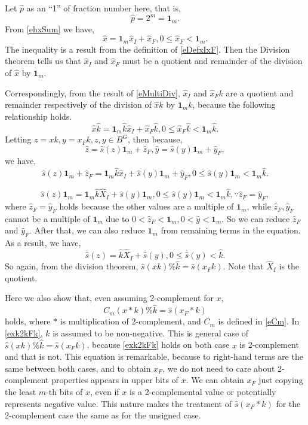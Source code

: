 \documentclass[a4paper]{article}
\newcommand{\eqlabel}[1]{\label{#1}
}
\newcommand{\hx}{{\hat{x}}}
\newcommand{\hp}{{\hat{p}}}
\newcommand{\hy}{{\hat{y}}}
\newcommand{\hz}{{\hat{z}}}
\newcommand{\hk}{{\hat{k}}}
\newcommand{\hs}{{\hat{s}}}
\newcommand{\hX}{{\hat{X}}}
\newcommand{\fum}{{\mathbf{1}_m}}
\begin{document}
Let \(\hp\) as an ``1'' of fraction number here, that is,
\[
    \hp = 2^m = \fum.
\]
From \eqref{ehxSum} we have,
\[
    \hx = \fum \hx_I + \hx_F, 0 \leq \hx_F < \fum.
\]
The inequality is a result from the definition of \eqref{eDefxIxF}. Then the Division theorem tells us that \(\hx_I\) and \(\hx_F\) must be a quotient and remainder of the division of \(\hx\) by \(\fum\).

Correspondingly, from the result of \eqref{eMultiDiv}, \(\hx_I\) and \(\hx_F k\) are a quotient and remainder respectively of the division of \(\hx k\) by \(\fum k\), because the following relationship holds.
\[
    \hx \hk = \fum \hk \hx_I + \hx_F \hk, 0 \leq \hx_F \hk < \fum \hk.
\]
Letting \(z = x k, y = x_F k, z, y \in B^{G}\), then because,
\begin{equation}
    \eqlabel{ezyfum}
    \hz = \hs(z) \fum + \hz_F, \hy  = \hs(y) \fum + \hy_F,
\end{equation}
we have,
\[
    \hs(z) \fum + \hz_F = \fum \hk \hx_I + \hs(y) \fum + \hy_F, 0 \leq \hs(y) \fum < \fum \hk.
\]

\[
    \hs(z) \fum = \fum \hk \hX_I + \hs(y) \fum , 0 \leq \hs(y) \fum < \fum \hk, \because \hz_F = \hy_F,
\]
where \(\hz_F = \hy_F\) holds because the other values are a multiple of \(\fum\), while \(\hz_F, \hy_F\) cannot be a multiple of \(\fum\) due to \(0< \hz_F < \fum, 0< \hy < \fum\). So we can reduce \(\hz_F\) and \(\hy_F\). After that, we can also reduce \(\fum\) from remaining terms in the equation. As a result, we have,
\begin{equation}
    \eqlabel{eUscaleRem}
    \hs(z)  =  \hk \hX_I + \hs(y), 0 \leq \hs(y)  <  \hk.
\end{equation}
So again, from the division theorem, \(\hs(x k)\% \hk = \hs(x_F k)\). Note that \(\hX_I\) is the quotient.

Here we also show that, even assuming 2-complement for \(x\), 
\begin{equation}
    \eqlabel{exk2kFk}
    C_m(x*k) \% \hk = \hs(x_F*k)
\end{equation} 
holds, where \(*\) is multiplication of 2-complement, and \(C_m\) is defined in \eqref{eCm}. In \eqref{exk2kFk}, \(k\) is assumed to be non-negative. This is general case of \(\hs(x k)\% \hk = \hs(x_F k)\), because \eqref{exk2kFk} holds on both case \(x\) is 2-complement and that is not. This equation is remarkable, because to right-hand terms are the same between both cases, and to obtain \(x_F\), we do not need to care about 2-complement properties appears in upper bits of \(x\). We can obtain \(x_F\) just copying the least \(m\)-th bits of \(x\), even if \(x\) is a 2-complemental value or potentially represents negative value. This nature makes the treatment of \(\hs(x_F*k)\) for the 2-complement case the same as for the unsigned case.
\end{document}

